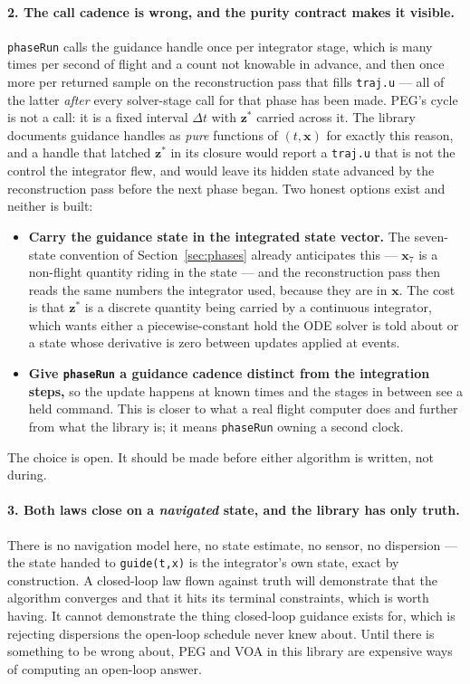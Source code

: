 \documentclass[11pt]{article}
\newcommand{\code}[1]{\texttt{#1}}
\begin{document}
\paragraph{2. The call cadence is wrong, and the purity contract makes it
visible.} \code{phaseRun} calls the guidance handle once per integrator stage,
which is many times per second of flight and a count not knowable in advance,
and then once more per returned sample on the reconstruction pass that fills
\code{traj.u} --- all of the latter \emph{after} every solver-stage call for
that phase has been made. PEG's cycle is not a call: it is a fixed interval
$\Delta t$ with $\mathbf{z}^{*}$ carried across it. The library documents
guidance handles as \emph{pure} functions of $(t,\mathbf{x})$ for exactly this
reason, and a handle that latched $\mathbf{z}^{*}$ in its closure would report
a \code{traj.u} that is not the control the integrator flew, and would leave
its hidden state advanced by the reconstruction pass before the next phase
began. Two honest options exist and neither is built:
\begin{itemize}
\item \textbf{Carry the guidance state in the integrated state vector.} The
seven-state convention of Section~\ref{sec:phases} already anticipates this ---
$\mathbf{x}_7$ is a non-flight quantity riding in the state --- and the
reconstruction pass then reads the same numbers the integrator used, because
they are in $\mathbf{x}$. The cost is that $\mathbf{z}^{*}$ is a discrete
quantity being carried by a continuous integrator, which wants either a
piecewise-constant hold the ODE solver is told about or a state whose
derivative is zero between updates applied at events.
\item \textbf{Give \code{phaseRun} a guidance cadence distinct from the
integration steps,} so the update happens at known times and the stages in
between see a held command. This is closer to what a real flight computer does
and further from what the library is; it means \code{phaseRun} owning a second
clock.
\end{itemize}
The choice is open. It should be made before either algorithm is written, not
during.

\paragraph{3. Both laws close on a \emph{navigated} state, and the library has
only truth.} There is no navigation model here, no state estimate, no sensor,
no dispersion --- the state handed to \code{guide(t,x)} is the integrator's own
state, exact by construction. A closed-loop law flown against truth will
demonstrate that the algorithm converges and that it hits its terminal
constraints, which is worth having. It cannot demonstrate the thing closed-loop
guidance exists for, which is rejecting dispersions the open-loop schedule
never knew about. Until there is something to be wrong about, PEG and VOA in
this library are expensive ways of computing an open-loop answer.
\end{document}
